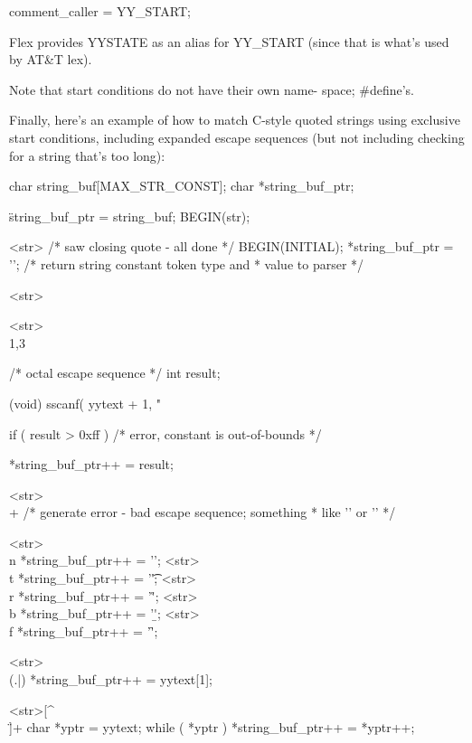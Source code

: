 \documentclass[12pt,spanish,twocolumn,lettersize]{article}
\begin{document}
	   comment_caller = YY_START;

       Flex provides YYSTATE as an alias for YY_START (since that
       is what's used by AT&T lex).

       Note that start conditions do not  have	their  own  name-
       space;  %
       #define's.

       Finally, here's an example of how to match C-style  quoted
       strings	 using	 exclusive  start  conditions,	including
       expanded escape sequences (but not including checking  for
       a string that's too long):


		   char string_buf[MAX_STR_CONST];
		   char *string_buf_ptr;

	   \"	   string_buf_ptr = string_buf; BEGIN(str);

	   <str>\"	  { /* saw closing quote - all done */
		   BEGIN(INITIAL);
		   *string_buf_ptr = '\0';
		   /* return string constant token type and
		    * value to parser
		    */
		   }

	   <str>

	   <str>\\[0-7]{1,3} {
		   /* octal escape sequence */
		   int result;

		   (void) sscanf( yytext + 1, "%

		   if ( result > 0xff )
			   /* error, constant is out-of-bounds */

		   *string_buf_ptr++ = result;
		   }

	   <str>\\[0-9]+ {
		   /* generate error - bad escape sequence; something
		    * like '' or ''
		    */
		   }

	   <str>\\n  *string_buf_ptr++ = '\n';
	   <str>\\t  *string_buf_ptr++ = '\t';
	   <str>\\r  *string_buf_ptr++ = '\r';
	   <str>\\b  *string_buf_ptr++ = '\b';
	   <str>\\f  *string_buf_ptr++ = '\f';

	   <str>\\(.|\n)  *string_buf_ptr++ = yytext[1];

	   <str>[^\\\n\"]+	  {
		   char *yptr = yytext;
		   while ( *yptr )
			   *string_buf_ptr++ = *yptr++;
		   }
\end{document}
